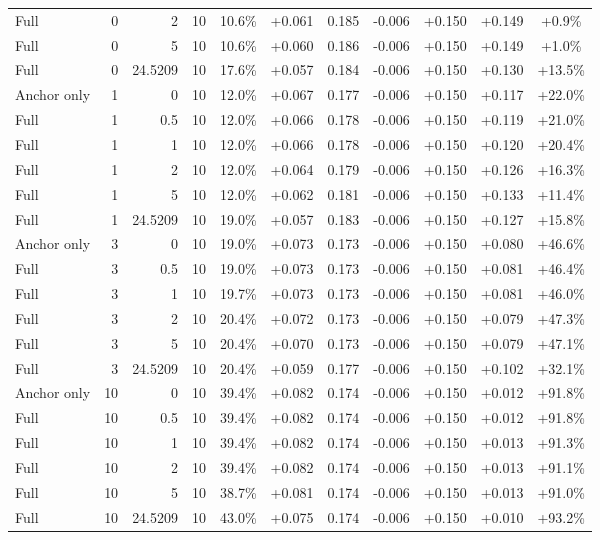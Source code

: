 \begin{table}[htbp]
\begin{tabular}{lrrrccccccc}
Full & 0 & 2 & 10 & 10.6\% & +0.061 & 0.185 & -0.006 & +0.150 & +0.149 & +0.9\% \\
Full & 0 & 5 & 10 & 10.6\% & +0.060 & 0.186 & -0.006 & +0.150 & +0.149 & +1.0\% \\
Full & 0 & 24.5209 & 10 & 17.6\% & +0.057 & 0.184 & -0.006 & +0.150 & +0.130 & +13.5\% \\
Anchor only & 1 & 0 & 10 & 12.0\% & +0.067 & 0.177 & -0.006 & +0.150 & +0.117 & +22.0\% \\
Full & 1 & 0.5 & 10 & 12.0\% & +0.066 & 0.178 & -0.006 & +0.150 & +0.119 & +21.0\% \\
Full & 1 & 1 & 10 & 12.0\% & +0.066 & 0.178 & -0.006 & +0.150 & +0.120 & +20.4\% \\
Full & 1 & 2 & 10 & 12.0\% & +0.064 & 0.179 & -0.006 & +0.150 & +0.126 & +16.3\% \\
Full & 1 & 5 & 10 & 12.0\% & +0.062 & 0.181 & -0.006 & +0.150 & +0.133 & +11.4\% \\
Full & 1 & 24.5209 & 10 & 19.0\% & +0.057 & 0.183 & -0.006 & +0.150 & +0.127 & +15.8\% \\
Anchor only & 3 & 0 & 10 & 19.0\% & +0.073 & 0.173 & -0.006 & +0.150 & +0.080 & +46.6\% \\
Full & 3 & 0.5 & 10 & 19.0\% & +0.073 & 0.173 & -0.006 & +0.150 & +0.081 & +46.4\% \\
Full & 3 & 1 & 10 & 19.7\% & +0.073 & 0.173 & -0.006 & +0.150 & +0.081 & +46.0\% \\
Full & 3 & 2 & 10 & 20.4\% & +0.072 & 0.173 & -0.006 & +0.150 & +0.079 & +47.3\% \\
Full & 3 & 5 & 10 & 20.4\% & +0.070 & 0.173 & -0.006 & +0.150 & +0.079 & +47.1\% \\
Full & 3 & 24.5209 & 10 & 20.4\% & +0.059 & 0.177 & -0.006 & +0.150 & +0.102 & +32.1\% \\
Anchor only & 10 & 0 & 10 & 39.4\% & +0.082 & 0.174 & -0.006 & +0.150 & +0.012 & +91.8\% \\
Full & 10 & 0.5 & 10 & 39.4\% & +0.082 & 0.174 & -0.006 & +0.150 & +0.012 & +91.8\% \\
Full & 10 & 1 & 10 & 39.4\% & +0.082 & 0.174 & -0.006 & +0.150 & +0.013 & +91.3\% \\
Full & 10 & 2 & 10 & 39.4\% & +0.082 & 0.174 & -0.006 & +0.150 & +0.013 & +91.1\% \\
Full & 10 & 5 & 10 & 38.7\% & +0.081 & 0.174 & -0.006 & +0.150 & +0.013 & +91.0\% \\
Full & 10 & 24.5209 & 10 & 43.0\% & +0.075 & 0.174 & -0.006 & +0.150 & +0.010 & +93.2\% \\

\end{tabular}
\end{table}
